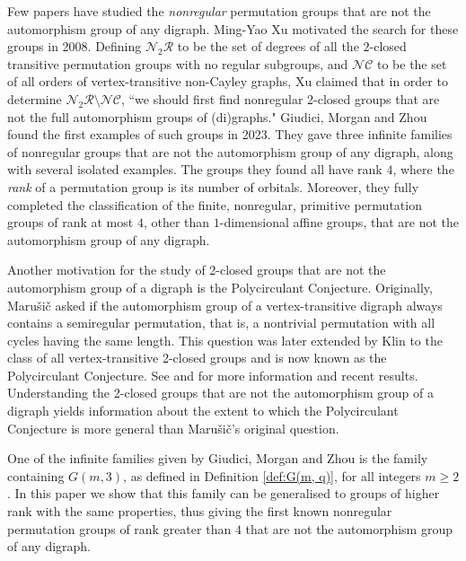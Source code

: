 \documentclass[ALCO, Unicode]{cedram}
\begin{document}
Few papers have studied the \emph{nonregular} permutation groups that are not the automorphism group of any digraph. Ming-Yao Xu \cite{ref:xu-regular-subgroups} motivated the search for these groups in 2008. Defining $\mathcal{N}_2 \mathcal{R}$ to be the set of degrees of all the $2$-closed transitive permutation groups with no regular subgroups, and $\mathcal{NC}$ to be the set of all orders of vertex-transitive non-Cayley graphs, Xu claimed that in order to determine $\mathcal{N}_2 \mathcal{R} \setminus \mathcal{NC}$, ``we should first find nonregular 2-closed groups that are not the full automorphism groups of (di)graphs." Giudici, Morgan and Zhou \cite{ref:giudici-primitive} found the first examples of such groups in 2023. They gave three infinite families of nonregular groups that are not the automorphism group of any digraph, along with several isolated examples. The groups they found all have rank $4$, where the \emph{rank} of a permutation group is its number of orbitals. Moreover, they fully completed the classification of the finite, nonregular, primitive permutation groups of rank at most $4$, other than $1$-dimensional affine groups, that are not the automorphism group of any digraph.

Another motivation for the study of 2-closed groups that are not the automorphism group of a digraph is the Polycirculant Conjecture. Originally, Maru\v{s}i\v{c} \cite{ref:marusic-vertex} asked if the automorphism group of a vertex-transitive digraph always contains a semiregular permutation, that is, a nontrivial permutation with all cycles having the same length.  This question was later extended by Klin \cite{ref:cameron-research} to the class of all vertex-transitive 2-closed groups and is now known as the Polycirculant Conjecture. See \cite{ref:cameron-transitive} and \cite{ref:arezoomand-polycirculant} for more information and recent results. Understanding the 2-closed groups that are not the automorphism group of a digraph yields information about the extent to which the Polycirculant Conjecture is more general than Maru\v{s}i\v{c}'s original question.

One of the infinite families given by Giudici, Morgan and Zhou \cite{ref:giudici-primitive} is the family containing $G{\left(m, 3 \right)}$, as defined in Definition \ref{def:G(m, q)}, for all integers $m \geqslant 2$. In this paper we show that this family can be generalised to groups of higher rank with the same properties, thus giving the first known nonregular permutation groups of rank greater than $4$ that are not the automorphism group of any digraph.
\end{document}
